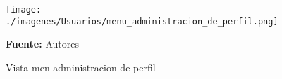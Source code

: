 \begin{figure}[!htb]
  \begin{center}
\texttt{[image: ./imagenes/Usuarios/menu\_administracion\_de\_perfil.png]}
    \caption{Vista men administracion de perfil}
    \label{fig:Vista_menu_administracion_de_perfil}
    \textbf{Fuente:}  Autores
  \end{center}
\end{figure}
